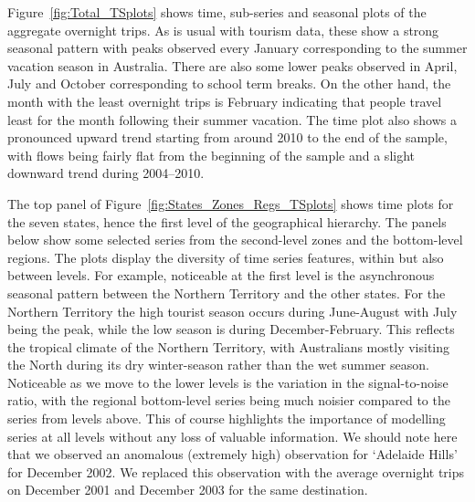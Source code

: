 \documentclass[12pt]{article}
\theoremstyle{definition}
\begin{document}
Figure~\ref{fig:Total_TSplots} shows time, sub-series and seasonal plots of the aggregate overnight trips. As is usual with tourism data, these show a strong seasonal pattern with peaks observed every January corresponding to the summer vacation season in Australia. There are also some lower peaks observed in April, July and October corresponding to school term breaks. On the other hand, the month with the least overnight trips is February indicating that people travel least for the month following their summer vacation. The time plot also shows a pronounced upward trend starting from around 2010 to the end of the sample, with flows being fairly flat from the beginning of the sample and a slight downward trend during 2004--2010.

The top panel of Figure~\ref{fig:States_Zones_Regs_TSplots} shows time plots for the seven states, hence the first level of the geographical hierarchy. The panels below show some selected series from the second-level zones and the bottom-level regions. The plots display the diversity of time series features, within but also between levels. For example, noticeable at the first level is the asynchronous seasonal pattern between the Northern Territory and the other states. For the Northern Territory the high tourist season occurs during June-August with July being the peak, while the low season is during December-February. This reflects the tropical climate of the Northern Territory, with Australians mostly visiting the North during its dry winter-season rather than the wet summer season. Noticeable as we move to the lower levels is the variation in the signal-to-noise ratio, with the regional bottom-level series being much noisier compared to the series from levels above. This of course highlights the importance of modelling series at all levels without any loss of valuable information. We should note here that we observed an anomalous (extremely high) observation for `Adelaide Hills' for December 2002. We replaced this observation with the average overnight trips on December 2001 and December 2003 for the same destination.
\end{document}
